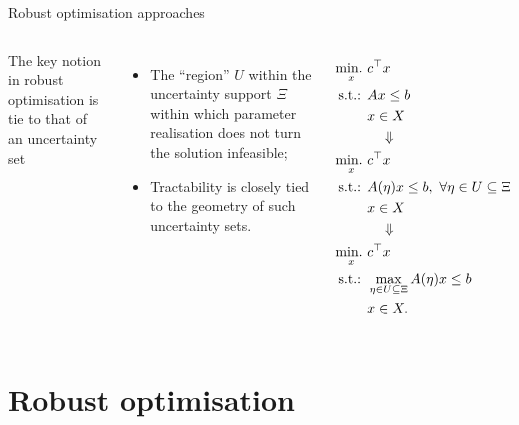 \begin{frame}{Robust optimisation approaches}
	
	
	\begin{columns}
	The key notion in robust optimisation is tie to that of an \alert{uncertainty set}
	\begin{itemize}
		\item The ``region'' $U$ within the uncertainty support $\Xi$ within which \alert{parameter realisation} does not turn the solution infeasible;
		\item Tractability is closely tied to the \alert{geometry} of such uncertainty sets.
	\end{itemize}
	
	\pause
	\vspace{-12pt}
	\begin{align*}
		\mathop{\text{min.} \ }_x & c^\top x \\
		\text{s.t.: } & Ax \le b \\
		& x \in X \\
		&\quad \Downarrow \\
		\mathop{\text{min.} \ }_x & c^\top x \\
		\text{s.t.: } & A(\eta)x \le b, \ \forall \eta \in U \subseteq \Xi \\
		& x \in X \\
		&\quad \Downarrow \\
		\mathop{\text{min.} \ }_x & c^\top x \\
		\text{s.t.: } & \max_{\eta \in U \subseteq \Xi}A(\eta)x \le b \\
			& x \in X.
	\end{align*}
	\end{columns}

\end{frame}


\section{Robust optimisation}


